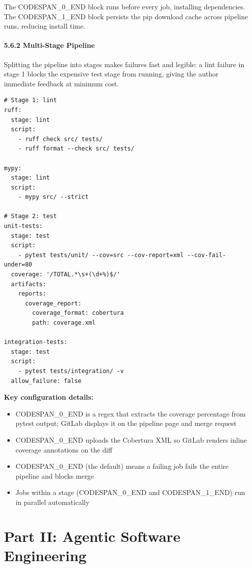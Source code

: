\documentclass[11pt,a4paper]{book}
\begin{document}
The CODESPAN\_0\_END block runs before every job, installing dependencies. The CODESPAN\_1\_END block persists the pip download cache across pipeline runs, reducing install time.

\subsection{5.6.2 Multi-Stage Pipeline}

Splitting the pipeline into stages makes failures fast and legible: a lint failure in stage 1 blocks the expensive test stage from running, giving the author immediate feedback at minimum cost.

\begin{lstlisting}
# Stage 1: lint
ruff:
  stage: lint
  script:
    - ruff check src/ tests/
    - ruff format --check src/ tests/

mypy:
  stage: lint
  script:
    - mypy src/ --strict

# Stage 2: test
unit-tests:
  stage: test
  script:
    - pytest tests/unit/ --cov=src --cov-report=xml --cov-fail-under=80
  coverage: '/TOTAL.*\s+(\d+%)$/'
  artifacts:
    reports:
      coverage_report:
        coverage_format: cobertura
        path: coverage.xml

integration-tests:
  stage: test
  script:
    - pytest tests/integration/ -v
  allow_failure: false

\end{lstlisting}

\textbf{Key configuration details:}

\begin{itemize}
  \item CODESPAN\_0\_END is a regex that extracts the coverage percentage from pytest output; GitLab displays it on the pipeline page and merge request
  \item CODESPAN\_0\_END uploads the Cobertura XML so GitLab renders inline coverage annotations on the diff
  \item CODESPAN\_0\_END (the default) means a failing job fails the entire pipeline and blocks merge
  \item Jobs within a stage (CODESPAN\_0\_END and CODESPAN\_1\_END) run in parallel automatically
\end{itemize}

\part{Part II: Agentic Software Engineering}
\end{document}
